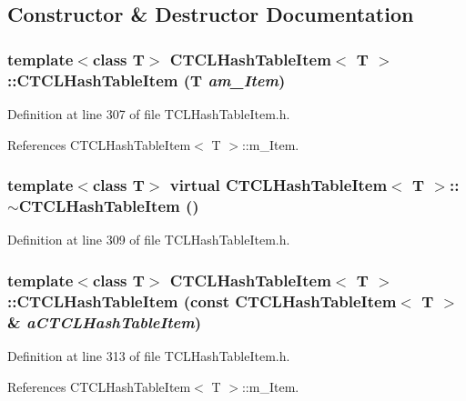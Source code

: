 \subsection{Constructor \& Destructor Documentation}
\subsubsection{\setlength{\rightskip}{0pt plus 5cm}template$<$class T$>$ CTCLHash\-Table\-Item$<$ T $>$::CTCLHash\-Table\-Item (T {\em am\_\-Item})\hspace{0.3cm}{\tt  [inline]}}\label{classCTCLHashTableItem_a0}




Definition at line 307 of file TCLHash\-Table\-Item.h.

References CTCLHash\-Table\-Item$<$ T $>$::m\_\-Item.
\subsubsection{\setlength{\rightskip}{0pt plus 5cm}template$<$class T$>$ virtual CTCLHash\-Table\-Item$<$ T $>$::$\sim$CTCLHash\-Table\-Item ()\hspace{0.3cm}{\tt  [inline, virtual]}}\label{classCTCLHashTableItem_a1}




Definition at line 309 of file TCLHash\-Table\-Item.h.
\subsubsection{\setlength{\rightskip}{0pt plus 5cm}template$<$class T$>$ CTCLHash\-Table\-Item$<$ T $>$::CTCLHash\-Table\-Item (const CTCLHash\-Table\-Item$<$ T $>$ \& {\em a\-CTCLHash\-Table\-Item})\hspace{0.3cm}{\tt  [inline]}}\label{classCTCLHashTableItem_a2}




Definition at line 313 of file TCLHash\-Table\-Item.h.

References CTCLHash\-Table\-Item$<$ T $>$::m\_\-Item.

